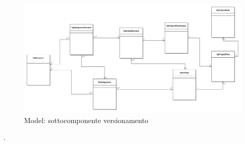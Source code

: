 \begin{landscape}
\begin{figure}[H]
\begin{center}
\includegraphics[width=1.6\textwidth]{img/ModelIncremento3.png}
\caption{Model: sottocomponente versionamento}
\label{fig:Model: sottocomponente versionamento}
\end{center}
\end{figure}
\end{landscape}.

